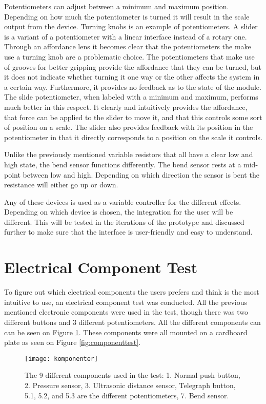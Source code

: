 Potentiometers can adjust between a minimum and maximum position. Depending on how much the potentiometer is turned it will result in the scale output from the device. Turning knobs is an example of potentiometers. A slider is a variant of a potentiometer with a linear interface instead of a rotary one. Through an affordance lens it becomes clear that the potentiometers the make use a turning knob are a problematic choice. The potentiometers that make use of grooves for better gripping provide the affordance that they can be turned, but it does not indicate whether turning it one way or the other affects the system in a certain way. Furthermore, it provides no feedback as to the state of the module. The slide potentiometer, when labeled with a minimum and maximum, performs much better in this respect. It clearly and intuitively provides the affordance, that force can be applied to the slider to move it, and that this controls some sort of position on a scale. The slider also provides feedback with its position in the potentiometer in that it directly corresponds to a position on the scale it controls. 


Unlike the previously mentioned variable resistors that all have a clear low and high state, the bend sensor functions differently. The bend sensor rests at a mid-point between low and high. Depending on which direction the sensor is bent the resistance will either go up or down.

Any of these devices is used as a variable controller for the different effects. Depending on which device is chosen, the integration for the user will be different. This will be tested in the iterations of the prototype and discussed further to make sure that the interface is user-friendly and easy to understand. 

\section{Electrical Component Test}\label{sec:comptest}
To figure out which electrical components the users prefers and think is the most intuitive to use, an electrical component test was conducted. All the previous mentioned electronic components were used in the test, though there was two different buttons and 3 different potentiometers. All the different components can can be seen on Figure \ref{fig:komponenter}. These components were all mounted on a cardboard plate as seen on Figure  \ref{fig:componenttest}.

\begin{figure}[!h] 
\centering
\texttt{[image: komponenter]}
\caption{\label{fig:komponenter} The 9 different components used in the test: 1. Normal push button, 2. Pressure sensor, 3. Ultrasonic distance sensor, Telegraph button, 5.1, 5.2, and 5.3 are the different potentiometers, 7. Bend sensor.}
\end{figure}

